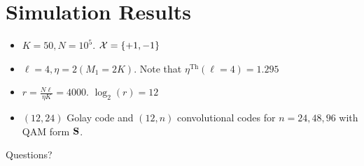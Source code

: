 \documentclass[10pt]{beamer}
\begin{document}
\section{Simulation Results}
\begin{frame}
\begin{itemize}
\item $K=50, N=10^5$. $\mathcal{X}=\{+1,-1\}$
\item $\ell=4, \eta =2 (M_1 =2K)$. Note that $\eta^{\text{Th}}(\ell=4)=1.295$
\item $r=\frac{N\ell}{\eta K}=4000$. $\log_2(r)=12$
\item $(12,24)$ Golay code and $(12,n)$ convolutional codes for $n=24,48,96$ with QAM form $\mathbf{S}$.
\end{itemize}

\begin{figure}
\resizebox{0.5\textwidth}{!}{
\begin{centering}

\end{centering}
}
\end{figure}

\end{frame}

\begin{frame}
\begin{centering}
\hspace{4ex}\LARGE{Questions?}\\
\vspace{4ex}
\end{centering}
\end{frame}
\end{document}
